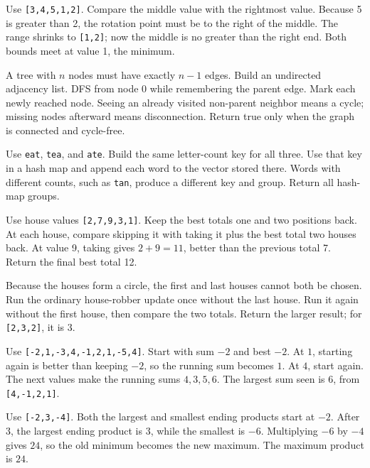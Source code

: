 \expandafter\def\csname lessontrace@21\endcsname{\visualtrace
  {Use \texttt{[3,4,5,1,2]}. Compare the middle value with the rightmost value.}
  {Because 5 is greater than 2, the rotation point must be to the right of the middle.}
  {The range shrinks to \texttt{[1,2]}; now the middle is no greater than the right end.}
  {Both bounds meet at value 1, the minimum.}}

\expandafter\def\csname lessontrace@22\endcsname{\visualtrace
  {A tree with \(n\) nodes must have exactly \(n-1\) edges. Build an undirected adjacency list.}
  {DFS from node 0 while remembering the parent edge. Mark each newly reached node.}
  {Seeing an already visited non-parent neighbor means a cycle; missing nodes afterward means disconnection.}
  {Return true only when the graph is connected and cycle-free.}}

\expandafter\def\csname lessontrace@23\endcsname{\visualtrace
  {Use \texttt{eat}, \texttt{tea}, and \texttt{ate}. Build the same letter-count key for all three.}
  {Use that key in a hash map and append each word to the vector stored there.}
  {Words with different counts, such as \texttt{tan}, produce a different key and group.}
  {Return all hash-map groups.}}

\expandafter\def\csname lessontrace@24\endcsname{\visualtrace
  {Use house values \texttt{[2,7,9,3,1]}. Keep the best totals one and two positions back.}
  {At each house, compare skipping it with taking it plus the best total two houses back.}
  {At value 9, taking gives \(2+9=11\), better than the previous total 7.}
  {Return the final best total 12.}}

\expandafter\def\csname lessontrace@25\endcsname{\visualtrace
  {Because the houses form a circle, the first and last houses cannot both be chosen.}
  {Run the ordinary house-robber update once without the last house.}
  {Run it again without the first house, then compare the two totals.}
  {Return the larger result; for \texttt{[2,3,2]}, it is 3.}}

\expandafter\def\csname lessontrace@26\endcsname{\visualtrace
  {Use \texttt{[-2,1,-3,4,-1,2,1,-5,4]}. Start with sum \(-2\) and best \(-2\).}
  {At \(1\), starting again is better than keeping \(-2\), so the running sum becomes \(1\).}
  {At \(4\), start again. The next values make the running sums \(4,3,5,6\).}
  {The largest sum seen is \(6\), from \texttt{[4,-1,2,1]}.}}

\expandafter\def\csname lessontrace@27\endcsname{\visualtrace
  {Use \texttt{[-2,3,-4]}. Both the largest and smallest ending products start at \(-2\).}
  {After \(3\), the largest ending product is \(3\), while the smallest is \(-6\).}
  {Multiplying \(-6\) by \(-4\) gives \(24\), so the old minimum becomes the new maximum.}
  {The maximum product is \(24\).}}

